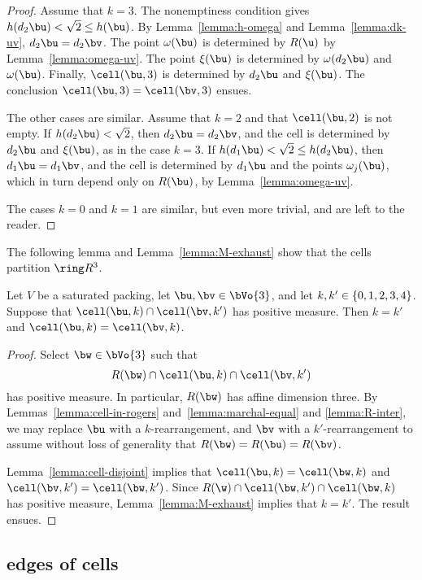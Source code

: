 \begin{cnl}
\begin{proof}
Assume that $k=3$.  The nonemptiness condition gives
$h(d_2\bu)<\sqrt2\le h(\bu)$.  By Lemma~\ref{lemma:h-omega} and
Lemma~\ref{lemma:dk-uv}, $d_2\bu=d_2\bv$.  The point $\omega(\bu)$ is
determined by $R(\u)$ by Lemma~\ref{lemma:omega-uv}.  The point
$\xi(\bu)$ is determined by $\omega(d_2\bu)$ and $\omega(\bu)$.
Finally, $\cell(\bu,3)$ is determined by $d_2\bu$ and $\xi(\bu)$.  The
conclusion $\cell(\bu,3)=\cell(\bv,3)$ ensues.

The other cases are similar.  Assume that $k=2$ and that
$\cell(\bu,2)$ is not empty.  If $h(d_2\bu)<\sqrt2$, then
$d_2\bu=d_2\bv$, and the cell is determined by $d_2\bu$ and
$\xi(\bu)$, as in the case $k=3$.  If $h(d_1\bu)<\sqrt2\le h(d_2\bu)$,
then $d_1\bu=d_1\bv$, and the cell is determined by $d_1\bu$ and the
points $\omega_j(\bu)$, which in turn depend only on $R(\bu)$, by
Lemma~\ref{lemma:omega-uv}.

The cases $k=0$ and $k=1$ are similar, but even more trivial, and are
left to the reader.
\end{proof}

The following lemma and Lemma~\ref{lemma:M-exhaust} 
show that the cells
partition $\vecR{3}$.


\begin{lemma}[]
\label{lemma:marchal-partition} %
%
Let $V$ be a saturated packing, let $\bu,\bv\in \bVo{3}$, and let
$k,k'\in \{0,1,2,3,4\}$.  Suppose that $\cell(\bu,k)\cap\cell(\bv,k')$
has positive measure.  Then $k=k'$ and $\cell(\bu,k)=\cell(\bv,k)$.
\end{lemma}


\begin{proof}  Select $\bw\in \bVo{3}$ such that 
\[
R(\bw)\cap \cell(\bu,k)\cap\cell(\bv,k')
\]
has positive measure.  In particular, $R(\bw)$ has affine dimension
three.  By Lemmas~\ref{lemma:cell-in-rogers}
and~\ref{lemma:marchal-equal} and \ref{lemma:R-inter}, we may replace $\bu$ with
a $k$-rearrangement, and $\bv$ with a $k'$-rearrangement to assume
without loss of generality that $R(\bw)=R(\bu)=R(\bv)$.

Lemma~\ref{lemma:cell-disjoint} implies that
$\cell(\bu,k)=\cell(\bw,k)$ and $\cell(\bv,k')=\cell(\bw,k')$.  Since
$R(\w)\cap\cell(\bw,k')\cap\cell(\bw,k)$ has positive measure, 
Lemma~\ref{lemma:M-exhaust} implies that $k=k'$.  The result ensues.
\end{proof}


\subsection{edges of cells}\label{edges-cells}


\end{cnl}
